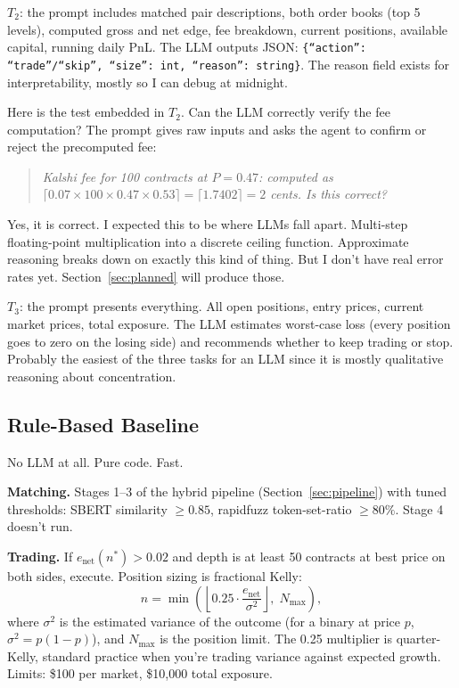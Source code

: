 \documentclass[11pt]{article}
\theoremstyle{definition}
\theoremstyle{remark}
\begin{document}
$T_2$: the prompt includes matched pair descriptions, both order books (top 5 levels), computed gross and net edge, fee breakdown, current positions, available capital, running daily PnL. The LLM outputs JSON: \texttt{\{``action'': ``trade''/``skip'', ``size'': int, ``reason'': string\}}. The reason field exists for interpretability, mostly so I can debug at midnight.

Here is the test embedded in $T_2$. Can the LLM correctly verify the fee computation? The prompt gives raw inputs and asks the agent to confirm or reject the precomputed fee:
\begin{quote}
\textit{Kalshi fee for 100 contracts at $P = 0.47$: computed as $\lceil 0.07 \times 100 \times 0.47 \times 0.53 \rceil = \lceil 1.7402 \rceil = 2$ cents. Is this correct?}
\end{quote}
Yes, it is correct. I expected this to be where LLMs fall apart. Multi-step floating-point multiplication into a discrete ceiling function. Approximate reasoning breaks down on exactly this kind of thing. But I don't have real error rates yet. Section~\ref{sec:planned} will produce those.

$T_3$: the prompt presents everything. All open positions, entry prices, current market prices, total exposure. The LLM estimates worst-case loss (every position goes to zero on the losing side) and recommends whether to keep trading or stop. Probably the easiest of the three tasks for an LLM since it is mostly qualitative reasoning about concentration.

\subsection{Rule-Based Baseline}
\label{sec:baseline}

No LLM at all. Pure code. Fast.

\textbf{Matching.} Stages 1--3 of the hybrid pipeline (Section~\ref{sec:pipeline}) with tuned thresholds: SBERT similarity $\geq 0.85$, rapidfuzz token-set-ratio $\geq 80\%$. Stage 4 doesn't run.

\textbf{Trading.} If $e_{\text{net}}(n^*) > 0.02$ and depth is at least 50 contracts at best price on both sides, execute. Position sizing is fractional Kelly:
\begin{equation}
\label{eq:kelly}
n = \min\left(\left\lfloor 0.25 \cdot \frac{e_{\text{net}}}{\sigma^2} \right\rfloor, \; N_{\text{max}}\right),
\end{equation}
where $\sigma^2$ is the estimated variance of the outcome (for a binary at price $p$, $\sigma^2 = p(1-p)$), and $N_{\text{max}}$ is the position limit. The 0.25 multiplier is quarter-Kelly, standard practice when you're trading variance against expected growth. Limits: \$100 per market, \$10,000 total exposure.
\end{document}

